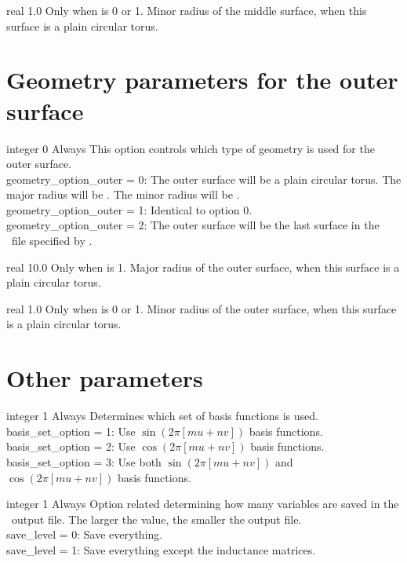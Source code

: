 \myhrule

{real}
{1.0}
{Only when  is 0 or 1.}
{Minor radius of the middle surface, when this surface is a plain circular torus.}



\section{Geometry parameters for the outer surface}

{integer}
{0}
{Always}
{This option controls which type of geometry is used for the outer surface.\\

{\ttfamily geometry\_option\_outer} = 0: The outer surface will be a plain circular torus. The major radius will be .
     The minor radius will be .\\

{\ttfamily geometry\_option\_outer} = 1: Identical to option 0.\\

{\ttfamily geometry\_option\_outer} = 2: The outer surface will be the last surface in the \vmec~file specified by .
}

\myhrule

{real}
{10.0}
{Only when  is 1.}
{Major radius of the outer surface, when this surface is a plain circular torus.}

\myhrule

{real}
{1.0}
{Only when  is 0 or 1.}
{Minor radius of the outer surface, when this surface is a plain circular torus.}

\section{Other parameters}

\myhrule

{integer}
{1}
{Always}
{Determines which set of basis functions is used.\\

{\ttfamily basis\_set\_option} = 1: Use $\sin(2 \pi [mu+nv])$ basis functions.\\

{\ttfamily basis\_set\_option} = 2: Use $\cos(2 \pi [mu+nv])$ basis functions.\\

{\ttfamily basis\_set\_option} = 3: Use both $\sin(2 \pi [mu+nv])$ and $\cos(2 \pi [mu+nv])$ basis functions.
}

\myhrule

{integer}
{1}
{Always}
{Option related determining how many variables are saved in the \netCDF~output file.  The larger the value, the smaller the output file.\\

{\ttfamily save\_level} = 0: Save everything.\\

{\ttfamily save\_level} = 1: Save everything except the inductance matrices.
}

